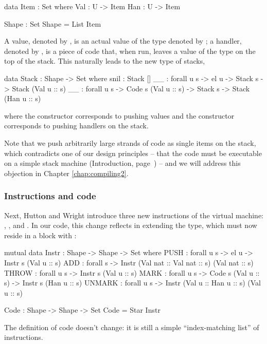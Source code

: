 \begin{code}
  data Item : Set where
    Val : U -> Item
    Han : U -> Item

  Shape : Set
  Shape = List Item
\end{code}
A value, denoted by , is an actual value of the type
denoted by ; a handler, denoted by , is a piece of code
that, when run, leaves a value of the type  on the top of the stack.
This naturally leads to the new type of stacks,
\begin{code}
  data Stack : Shape -> Set where
    snil : Stack []
    _\scons\_ : forall {u s} -> el u -> Stack s -> Stack (Val u :: s)
    _\sconsh\_ : forall {u s} -> Code s (Val u :: s) -> Stack s -> Stack (Han u :: s)
\end{code}
where the constructor \ident{\scons\!\!} corresponds to pushing values and the
constructor \ident{\sconsh\!\!} corresponds to pushing handlers on the stack.

Note that we push arbitrarily large strands of code as single items on the stack,
which contradicts one of our design principles -- that the
code must be executable on a simple stack machine (Introduction, page~\pageref{objectives})
-- and we will address this objection in Chapter \ref{chap:compiling2}.

\subsubsection{Instructions and code}

Next, Hutton and Wright introduce three new instructions of the virtual machine:
, , and . In our code, this change
reflects in extending the  type, which must now reside in a
 block with :

\begin{code}
  mutual
    data Instr : Shape -> Shape -> Set where
      PUSH : forall {u s} -> el u -> Instr s (Val u :: s)
      ADD : forall s -> Instr (Val nat :: Val nat :: s) (Val nat :: s)
      THROW : forall {u s} -> Instr s (Val u :: s)
      MARK : forall {u s} -> Code s (Val u :: s) -> Instr s (Han u :: s)
      UNMARK : forall {u s} -> Instr (Val u :: Han u :: s) (Val u :: s)

    Code : Shape -> Shape -> Set
    Code = Star Instr
\end{code}

\noindent The definition of code doesn't change: it is still a simple
``index-matching list'' of instructions.

